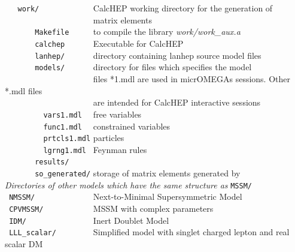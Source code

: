 \documentclass[12pt,a4paper]{article}
\begin{document}
\verb|   work/            |              CalcHEP working directory for the generation of   \\
\verb|                    |             matrix elements                                    \\
\verb|       Makefile     |  to compile the library {\it work/work\_aux.a}           \\ 
\verb|       calchep      | Executable for CalcHEP\\
\verb|       lanhep/      |          directory containing lanhep source model files   \\
\verb|       models/      |  directory for files  which specifies the model\\
\verb|                    | files *1.mdl are used in micrOMEGAs sessions. Other *.mdl files\\
\verb|                    | are intended for CalcHEP interactive sessions\\
\verb|         vars1.mdl  |  free  variables   \\
\verb|         func1.mdl  |  constrained variables   \\
\verb|         prtcls1.mdl|  particles  \\
\verb|         lgrng1.mdl |  Feynman rules\\
\verb|       results/  |                                                  \\
\verb|       so_generated/|   storage  of  matrix elements generated by \calchep \\
{\it Directories of other models which have the same structure as} {\tt  MSSM/ }\\
\verb| NMSSM/             |         Next-to-Minimal Supersymmetric Model\cite{Ellwanger:2006rn,Belanger:2005kh} \\
\verb| CPVMSSM/           |         MSSM with complex parameters\cite{Lee:2003nta,  Belanger:2006qa} \\
\verb| IDM/               |         Inert Doublet Model\cite{Barbieri:2006dq}  \\
\verb| LLL_scalar/        | Simplified model with singlet charged lepton and real scalar DM \\ 
\end{document}
